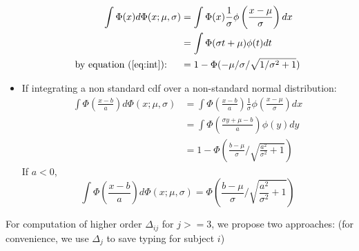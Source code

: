 \documentclass[12pt]{article}
\begin{document}
\begin{itemize}
  \begin{align*}
    \int \Phi(x)d\Phi(x; \mu, \sigma) & = \int \Phi(x) \frac{1}{\sigma} \phi \left( \frac{x-\mu}{\sigma} \right) dx \\
    & = \int \Phi(\sigma t + \mu)\phi(t) dt \\
    \text{by equation (\ref{eq:int}): } \quad & = 1 -
    \Phi(-\mu/\sigma/\sqrt{1/\sigma^2+1})
  \end{align*}
\item If integrating a non standard cdf over a non-standard normal
  distribution:
  \begin{align}
    \int \Phi \left( \frac{x-b}{a} \right) d\Phi(x; \mu, \sigma) & = \int \Phi \left( \frac{x-b}{a} \right) \frac{1}{\sigma} \phi \left( \frac{x-\mu}{\sigma} \right) dx \nonumber\\
    &= \int \Phi \left( \frac{\sigma y + \mu - b}{a}  \right) \phi(y) dy \nonumber \\
    \label{eq:intg1}
    & = 1- \Phi \left( \frac{b-\mu}{\sigma} / \sqrt{\frac{a^2}{\sigma^2}+1} \right)
  \end{align}
  If $a < 0$,
  \begin{equation}
    \label{eq:intg2}
    \int \Phi \left( \frac{x-b}{a} \right) d\Phi(x; \mu, \sigma) = \Phi \left( \frac{b-\mu}{\sigma} / \sqrt{\frac{a^2}{\sigma^2}+1} \right)
  \end{equation}

\end{itemize}

For computation of higher order $\Delta_{ij}$ for $j >= 3$, we propose two
approaches: (for convenience, we use $\Delta_j$ to save typing for
subject $i$)
\end{document}
